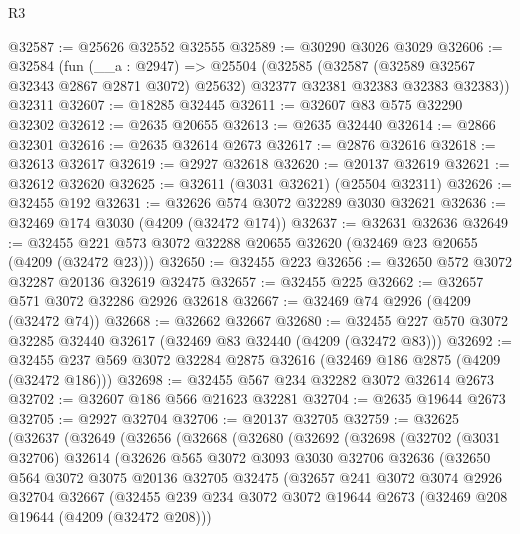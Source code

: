 \begin{lexlean}{R3}
\begin{coremodule}
@32587 := @25626 @32552 @32555
@32589 := @30290 @3026 @3029
@32606 := @32584
    (fun (__a : @2947) =>
    @25504
      (@32585
        (@32587 (@32589 @32567 @32343 @2867 @2871 @3072) @25632)
        @32377
        @32381
        @32383
        @32383
        @32383))
    @32311
@32607 := @18285 @32445
@32611 := @32607 @83 @575 @32290 @32302
@32612 := @2635 @20655
@32613 := @2635 @32440
@32614 := @2866 @32301
@32616 := @2635 @32614 @2673
@32617 := @2876 @32616
@32618 := @32613 @32617
@32619 := @2927 @32618
@32620 := @20137 @32619
@32621 := @32612 @32620
@32625 := @32611 (@3031 @32621) (@25504 @32311)
@32626 := @32455 @192
@32631 := @32626 @574 @3072 @32289 @3030 @32621
@32636 := @32469 @174 @3030 (@4209 (@32472 @174))
@32637 := @32631 @32636
@32649 := @32455 @221 @573 @3072 @32288 @20655 @32620 (@32469 @23 @20655 (@4209 (@32472 @23)))
@32650 := @32455 @223
@32656 := @32650 @572 @3072 @32287 @20136 @32619 @32475
@32657 := @32455 @225
@32662 := @32657 @571 @3072 @32286 @2926 @32618
@32667 := @32469 @74 @2926 (@4209 (@32472 @74))
@32668 := @32662 @32667
@32680 := @32455 @227 @570 @3072 @32285 @32440 @32617 (@32469 @83 @32440 (@4209 (@32472 @83)))
@32692 := @32455 @237 @569 @3072 @32284 @2875 @32616 (@32469 @186 @2875 (@4209 (@32472 @186)))
@32698 := @32455 @567 @234 @32282 @3072 @32614 @2673
@32702 := @32607 @186 @566 @21623 @32281
@32704 := @2635 @19644 @2673
@32705 := @2927 @32704
@32706 := @20137 @32705
@32759 := @32625
    (@32637
      (@32649
        (@32656
          (@32668
            (@32680
              (@32692
                (@32698
                  (@32702
                    (@3031 @32706)
                    @32614
                    (@32626
                      @565
                      @3072
                      @3093
                      @3030
                      @32706
                      @32636
                      (@32650
                        @564
                        @3072
                        @3075
                        @20136
                        @32705
                        @32475
                        (@32657
                          @241
                          @3072
                          @3074
                          @2926
                          @32704
                          @32667
                          (@32455
                            @239
                            @234
                            @3072
                            @3072
                            @19644
                            @2673
                            (@32469 @208 @19644 (@4209 (@32472 @208)))

\end{coremodule}
\end{lexlean}

